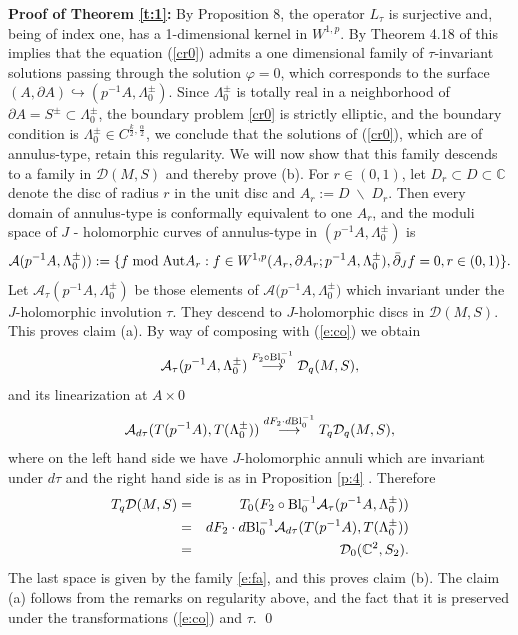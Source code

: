 \documentclass{amsart}
\newcommand{\bean}{\begin{eqnarray*}}
\newcommand{\eean}{\end{eqnarray*}}
\begin{document}
\noindent
{\bf Proof of Theorem \ref{t:1}:} 
By Proposition 8, the operator $L_\tau$ is surjective and, being of index one, has a 1-dimensional  kernel in $W^{1,p}$. By Theorem 4.18 of \cite{V} this implies that  the equation (\ref{cr0}) admits a one dimensional family of $\tau$-invariant solutions passing through the solution $ \varphi=0$,  which corresponds to the surface $(A, \partial A) \hookrightarrow (p^{-1}A,\Lambda_0^{\pm})$. 
Since $\Lambda_0^\pm$ is totally real in a neighborhood of $\partial A=S^\pm \subset  \Lambda_0^\pm$, the boundary problem \eqref{cr0} is strictly elliptic, and the boundary condition is $\Lambda_0^\pm \in C^{\frac{k}{2},\frac{\alpha}{2}}$, we conclude that the solutions of  (\ref{cr0}), which are of annulus-type, retain this regularity. We will now show that this family descends to a family in $\mathcal{D}(M, S)$ and thereby prove (b). For $r\in (0,1)$, let $D_r \subset D \subset \mathbb{C}$ denote the disc of radius $r$ in the unit disc and $A_r:= D \; \backslash \;D_r$. Then every domain of annulus-type is conformally equivalent to one  $A_r$, and the moduli space of $J$ - holomorphic curves of annulus-type in $(p^{-1}A,\Lambda_0^{\pm})$ is
\[
{\mathcal A}(p^{-1}A,\Lambda_0^{\pm})) : =\{
f {\rm\; mod\; Aut} A_r:f \in 
W^{1,p}(A_r,\partial A_r ; p^{-1}A,\Lambda_0^{\pm}), \bar\partial_{J}f=0,
r \in (0,1) \}.
\]
Let ${\mathcal A}_\tau(p^{-1}A,\Lambda_0^{\pm})$ be those elements of 
${\mathcal A(p^{-1}A,}\Lambda_0^{\pm})$ 
which invariant under the $J$-holomorphic involution $\tau$. They descend to $J$-holomorphic discs in ${\mathcal D}(M, S)$. This proves claim (a). By way of composing with  (\ref{e:co}) we obtain
\[
{\mathcal A}_\tau(p^{-1}A,\Lambda_0^{\pm})  
\stackrel{F_2 \circ {\rm Bl}_0^{-1}}
 \longrightarrow {\mathcal D}_q({M,S}),
\]
and its linearization at $A \times 0$
\[
{\mathcal A}_{d\tau}(T(p^{-1}A),T(\Lambda_0^{\pm})) \stackrel{d F_2 \cdot d{\rm Bl}_0^{-1} } 
\longrightarrow T_ q {\mathcal D}_q(M,S),
\]
where on the left hand side we have $J$-holomorphic annuli which are invariant under $d\tau$ and the right hand side is as in Proposition \eqref{p:4} . Therefore
\bean
T_ q {\mathcal D}(M,S) &=& T_0 (F_2 \circ {\rm Bl}_0^{-1} {\mathcal A}_\tau (p^{-1}A,\Lambda_0^{\pm}))\cr
 &=& dF_2  \cdot d{\rm Bl}_0^{-1} {\mathcal A}_{d\tau}(T(p^{-1}A),T(\Lambda_0^{\pm})) \cr
 &=& {\mathcal D}_0(\mathbb{C}^2, S_2).
\eean
The last space is given by the family \eqref{e:fa}, and this proves claim (b). The claim (a) follows from the remarks  on regularity above, and the fact that it is preserved under the transformations (\ref{e:co}) and $\tau$. \qed
\end{document}
